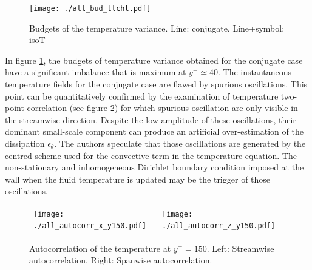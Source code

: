 \documentclass[review]{elsarticle}
\begin{document}
\begin{figure}[htbp]
\centering
\texttt{[image: ./all\_bud\_ttcht.pdf]}
\caption{Budgets of the temperature variance. Line: conjugate. Line+symbol: isoT}
\label{all_bud_tt}
\end{figure}

In figure \ref{all_bud_tt}, the budgets of temperature variance obtained for the conjugate case have a significant imbalance that is maximum at $y^+ \simeq 40$. The instantaneous temperature fields for the conjugate case are flawed by spurious oscillations. This point can be quantitatively confirmed by the examination of temperature two-point correlation (see figure \ref{all_autocorr_y150}) for which spurious oscillation are only visible in the streamwise direction. Despite the low amplitude of these oscillations, their dominant small-scale component can produce an artificial over-estimation of the dissipation $\epsilon_\theta$. The authors speculate that those oscillations are generated by the centred scheme used for the convective term in the temperature equation. The non-stationary and inhomogeneous Dirichlet boundary condition imposed at the wall when the fluid temperature is updated may be the trigger of those oscillations.

\begin{figure}[htbp]
\begin{tabular}[htbp]{ll}
\texttt{[image: ./all\_autocorr\_x\_y150.pdf]} &
\texttt{[image: ./all\_autocorr\_z\_y150.pdf]}
\end{tabular}
\caption{Autocorrelation of the temperature at $y^+=150$. Left: Streamwise autocorrelation. Right: Spanwise autocorrelation.}
\label{all_autocorr_y150}
\end{figure}
\end{document}
